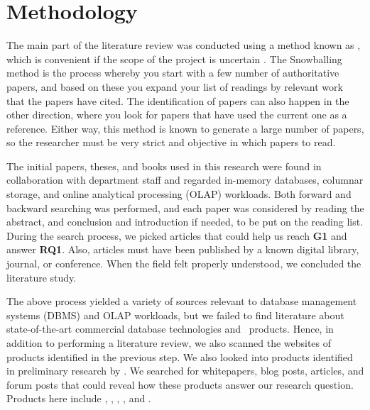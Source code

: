 \section{Methodology}
\label{sec:Methodology}
The main part of the literature review was conducted using a method known as , which is convenient if the scope of the project is uncertain \cite{Ang2014-nm}. The Snowballing method is the process whereby you start with a few number of authoritative papers, and based on these you expand your list of readings by relevant work that the papers have cited. The identification of papers can also happen in the other direction, where you look for papers that have used the current one as a reference. Either way, this method is known to generate a large number of papers, so the researcher must be very strict and objective in which papers to read.

The initial papers, theses, and books used in this research were found in collaboration with department staff and regarded in-memory databases, columnar storage, and online analytical processing (OLAP) workloads. Both forward and backward searching was performed, and each paper was considered by reading the abstract, and conclusion and introduction if needed, to be put on the reading list. During the search process, we picked articles that could help us reach \textbf{G1} and answer \textbf{RQ1}. Also, articles must have been published by a known digital library, journal, or conference. 
When the field felt properly understood, we concluded the  literature study.

The above process yielded a variety of sources relevant to database management systems (DBMS) and OLAP workloads, but we failed to find literature about state-of-the-art commercial database technologies and \bd~products. Hence, in addition to performing a  literature review, we also scanned the websites of products identified in the previous step. We also looked into products identified in preliminary research by \genus. We searched for whitepapers, blog posts, articles, and forum posts that could reveal how these products answer our research question. Products here include , , , , and .
